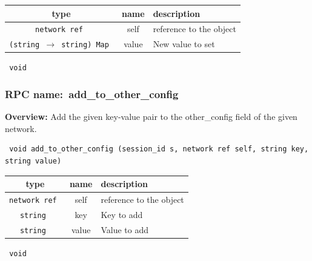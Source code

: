  
\vspace{0.3cm}
\begin{tabular}{|c|c|p{7cm}|}
 \hline
{\bf type} & {\bf name} & {\bf description} \\ \hline
{\tt network ref } & self & reference to the object \\ \hline 

{\tt (string $\rightarrow$ string) Map } & value & New value to set \\ \hline 

\end{tabular}

\vspace{0.3cm}

{\tt 
void
}



\vspace{0.3cm}
\vspace{0.3cm}
\vspace{0.3cm}
\subsubsection{RPC name:~add\_to\_other\_config}

{\bf Overview:} 
Add the given key-value pair to the other\_config field of the given
network.

\begin{verbatim} void add_to_other_config (session_id s, network ref self, string key, string value)\end{verbatim}



 
\vspace{0.3cm}
\begin{tabular}{|c|c|p{7cm}|}
 \hline
{\bf type} & {\bf name} & {\bf description} \\ \hline
{\tt network ref } & self & reference to the object \\ \hline 

{\tt string } & key & Key to add \\ \hline 

{\tt string } & value & Value to add \\ \hline 

\end{tabular}

\vspace{0.3cm}

{\tt 
void
}



